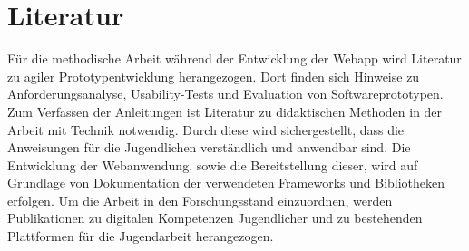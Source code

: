 \documentclass[
    12pt,
    ngerman,
    a4paper,
    oneside
]{book}
\begin{document}
\section*{Literatur}
Für die methodische Arbeit während der Entwicklung der Webapp wird Literatur zu agiler Prototypentwicklung herangezogen.\cite{tremp2022agile}
Dort finden sich Hinweise zu Anforderungsanalyse, Usability-Tests und Evaluation von Softwareprototypen.
Zum Verfassen der Anleitungen ist Literatur zu didaktischen Methoden in der Arbeit mit Technik notwendig.\cite{wallwork2014user}
Durch diese wird sichergestellt, dass die Anweisungen für die Jugendlichen verständlich und anwendbar sind.
Die Entwicklung der Webanwendung, sowie die Bereitstellung dieser, wird auf Grundlage von Dokumentation der verwendeten Frameworks und Bibliotheken erfolgen.\cite{dockerDocs}\cite{djangoDocs}
Um die Arbeit in den Forschungsstand einzuordnen, werden Publikationen zu digitalen Kompetenzen Jugendlicher\cite{schaumburg2019nutzung}\cite{hartmann2020digitale} und zu bestehenden Plattformen für die Jugendarbeit\cite{jugendarbeit.digital}\cite{groupsenz} herangezogen.

\printbibliography{}
\end{document}
